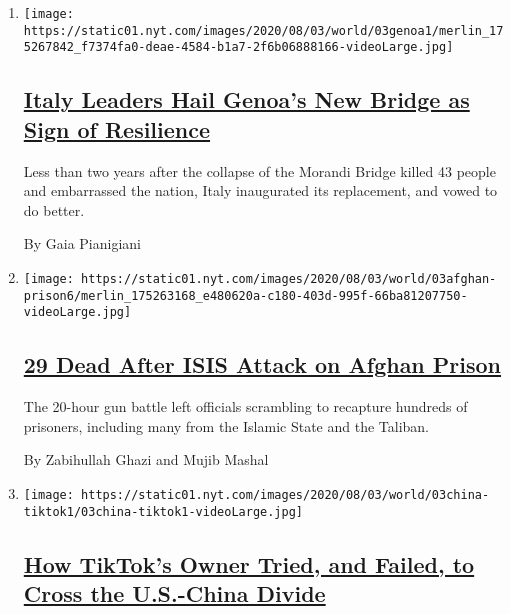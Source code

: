 \begin{enumerate}
\def\labelenumi{\arabic{enumi}.}
\item
  \texttt{[image: https://static01.nyt.com/images/2020/08/03/world/03genoa1/merlin\_175267842\_f7374fa0-deae-4584-b1a7-2f6b06888166-videoLarge.jpg]}

  \hypertarget{italy-leaders-hail-genoas-new-bridge-as-sign-of-resilience}{%
  \subsection{\texorpdfstring{\href{/2020/08/03/world/europe/genoa-italy-new-bridge.html}{Italy
  Leaders Hail Genoa's New Bridge as Sign of
  Resilience}}{Italy Leaders Hail Genoa's New Bridge as Sign of Resilience}}\label{italy-leaders-hail-genoas-new-bridge-as-sign-of-resilience}}

  Less than two years after the collapse of the Morandi Bridge killed 43
  people and embarrassed the nation, Italy inaugurated its replacement,
  and vowed to do better.

  By Gaia Pianigiani
\item
  \texttt{[image: https://static01.nyt.com/images/2020/08/03/world/03afghan-prison6/merlin\_175263168\_e480620a-c180-403d-995f-66ba81207750-videoLarge.jpg]}

  \hypertarget{29-dead-after-isis-attack-on-afghan-prison}{%
  \subsection{\texorpdfstring{\href{/2020/08/03/world/asia/afghanistan-prison-isis-taliban.html}{29
  Dead After ISIS Attack on Afghan
  Prison}}{29 Dead After ISIS Attack on Afghan Prison}}\label{29-dead-after-isis-attack-on-afghan-prison}}

  The 20-hour gun battle left officials scrambling to recapture hundreds
  of prisoners, including many from the Islamic State and the Taliban.

  By Zabihullah Ghazi and Mujib Mashal
\item
  \texttt{[image: https://static01.nyt.com/images/2020/08/03/world/03china-tiktok1/03china-tiktok1-videoLarge.jpg]}

  \hypertarget{how-tiktoks-owner-tried-and-failed-to-cross-the-us-china-divide}{%
  \subsection{\texorpdfstring{\href{/2020/08/03/technology/tiktok-bytedance-us-china.html}{How
  TikTok's Owner Tried, and Failed, to Cross the U.S.-China
  Divide}}{How TikTok's Owner Tried, and Failed, to Cross the U.S.-China Divide}}\label{how-tiktoks-owner-tried-and-failed-to-cross-the-us-china-divide}}


\end{enumerate}
